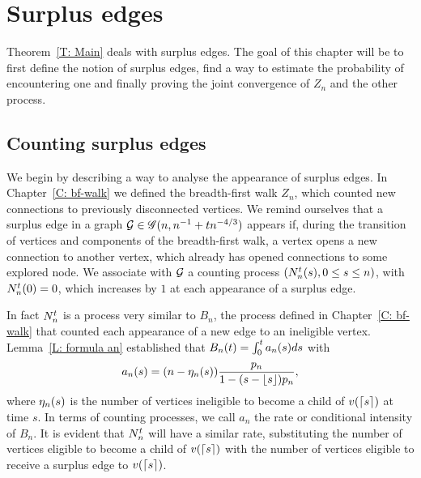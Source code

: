 
\chapter{Surplus edges}

Theorem~\ref{T: Main} deals with surplus edges.
The goal of this chapter will be to first define the notion of surplus edges,
find a way to estimate the probability of encountering one and finally proving the joint convergence of $Z_n$ and the other process.

\section{Counting surplus edges}

We begin by describing a way to analyse the appearance of surplus edges.
In Chapter~\ref{C: bf-walk} we defined the breadth-first walk $Z_n$, 
which counted new connections to previously disconnected vertices.
We remind ourselves that a surplus edge in a graph $\mathcal{G} \in \mathscr{G}(n, n^{-1} + tn^{-4/3})$ appears if,
during the transition of vertices and components of the breadth-first walk,
a vertex opens a new connection to another vertex, 
which already has opened connections to some explored node.
We associate with $\mathcal{G}$ a counting process $(N_n^t(s), 0 \leq s \leq n)$,
with $N_n^t(0) = 0$, which increases by $1$ at each appearance of a surplus edge.

In fact $N_n^t$ is a process very similar to $B_n$,
the process defined in Chapter~\ref{C: bf-walk} that counted each appearance of a new edge to an ineligible vertex.
Lemma~\ref{L: formula an} established that $B_n(t) = \int_{0}^{t} a_n(s)ds$ with
\begin{equation*}
	a_n(s) = (n - \eta_n(s)) \frac{p_n}{1-(s-\lfloor s\rfloor)p_n},
\end{equation*}
where $\eta_n(s)$ is the number of vertices ineligible to become a child of $v(\lceil s\rceil)$ at time $s$.
In terms of counting processes, we call $a_n$ the rate or conditional intensity of $B_n$.
It is evident that $N_n^t$ will have a similar rate,
substituting the number of vertices eligible to become a child of $v(\lceil s\rceil)$ with the number of vertices eligible to receive a surplus edge to $v(\lceil s\rceil)$.

